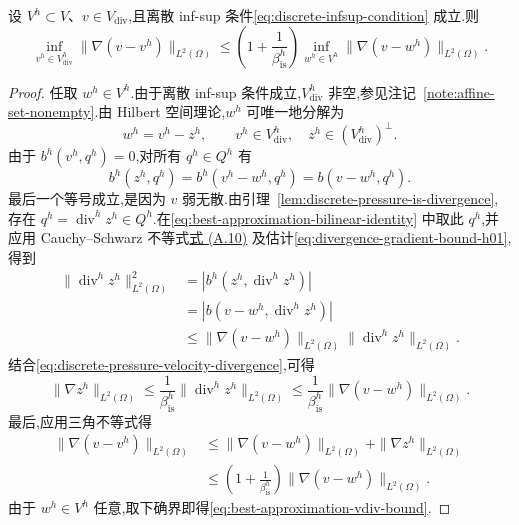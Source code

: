 \begin{lemma}\label{lem:best-approximation-vdiv}
设 $V^h\subset V$、$v\in V_{\mathrm{div}}$,且离散 inf-sup 条件\cref{eq:discrete-infsup-condition} 成立.则
\begin{equation}\label{eq:best-approximation-vdiv-bound}
  \inf_{v^h\in V_{\mathrm{div}}^h}
      \|\nabla(v-v^h)\|_{L^2(\Omega)}
   \le\left(1+\frac1{\beta_{\mathrm{is}}^h}\right)
      \inf_{w^h\in V^h}
      \|\nabla(v-w^h)\|_{L^2(\Omega)}.
\end{equation}
\end{lemma}
\begin{proof}
任取 $w^h\in V^h$.由于离散 inf-sup 条件成立,$V_{\mathrm{div}}^h$ 非空,参见注记~\ref{note:affine-set-nonempty}.由 Hilbert 空间理论,$w^h$ 可唯一地分解为
\[
  w^h=v^h-z^h,
  \qquad v^h\in V_{\mathrm{div}}^h,
  \quad z^h\in(V_{\mathrm{div}}^h)^{\perp}.
\]
由于 $b^h(v^h,q^h)=0$,对所有 $q^h\in Q^h$ 有
\begin{equation}\label{eq:best-approximation-bilinear-identity}
  b^h(z^h,q^h)
    =b^h(v^h-w^h,q^h)
    =b(v-w^h,q^h).
\end{equation}
最后一个等号成立,是因为 $v$ 弱无散.由引理~\ref{lem:discrete-pressure-is-divergence},存在 $q^h=\operatorname{div}^h z^h\in Q^h$.在\cref{eq:best-approximation-bilinear-identity} 中取此 $q^h$,并应用 Cauchy--Schwarz 不等式\hyperref[eq:appendix-a-10]{式 (A.10)} 及估计\cref{eq:divergence-gradient-bound-h01},得到
\[
\begin{aligned}
  \|\operatorname{div}^h z^h\|_{L^2(\Omega)}^2
   &=|b^h(z^h,\operatorname{div}^h z^h)|\\
   &=|b(v-w^h,\operatorname{div}^h z^h)|\\
   &\le\|\nabla(v-w^h)\|_{L^2(\Omega)}
        \|\operatorname{div}^h z^h\|_{L^2(\Omega)}.
\end{aligned}
\]
结合\cref{eq:discrete-pressure-velocity-divergence},可得
\[
  \|\nabla z^h\|_{L^2(\Omega)}
    \le\frac1{\beta_{\mathrm{is}}^h}
          \|\operatorname{div}^h z^h\|_{L^2(\Omega)}
    \le\frac1{\beta_{\mathrm{is}}^h}
          \|\nabla(v-w^h)\|_{L^2(\Omega)}.
\]
最后,应用三角不等式得
\[
\begin{aligned}
  \|\nabla(v-v^h)\|_{L^2(\Omega)}
   &\le\|\nabla(v-w^h)\|_{L^2(\Omega)}
      +\|\nabla z^h\|_{L^2(\Omega)}\\
   &\le\left(1+\frac1{\beta_{\mathrm{is}}^h}\right)
        \|\nabla(v-w^h)\|_{L^2(\Omega)}.
\end{aligned}
\]
由于 $w^h\in V^h$ 任意,取下确界即得\cref{eq:best-approximation-vdiv-bound}.
\end{proof}

